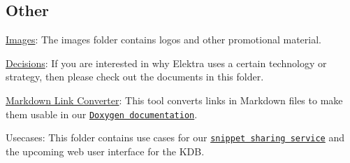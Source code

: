 \subsection*{Other}


\begin{DoxyItemize}
\item \hyperlink{doc_images_README_md}{Images}\+: The images folder contains logos and other promotional material.
\item \hyperlink{doc_decisions_README_md}{Decisions}\+: If you are interested in why Elektra uses a certain technology or strategy, then please check out the documents in this folder.
\item \hyperlink{doc_markdownlinkconverter_README_md}{Markdown Link Converter}\+: This tool converts links in Markdown files to make them usable in our \href{https://doc.libelektra.org/api/current/html}{\tt Doxygen documentation}.
\item Usecases\+: This folder contains use cases for our \href{https://www.libelektra.org/auth/login}{\tt snippet sharing service} and the upcoming web user interface for the K\+DB. 
\end{DoxyItemize}
